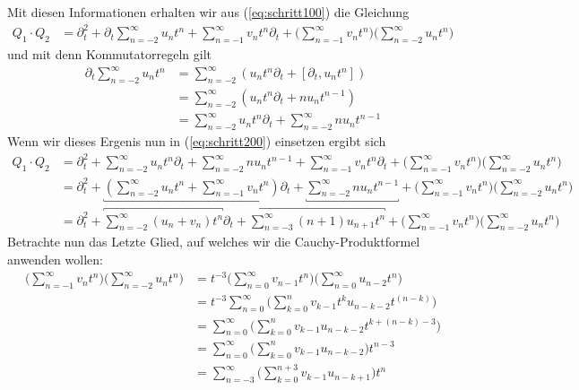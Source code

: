 Mit diesen Informationen erhalten wir aus (\ref{eq:schritt100}) die Gleichung
\begin{align} \label{eq:schritt200}
Q_1\cdot Q_2&=\partial_t^2 + \partial_t \sum_{n=-2}^\infty u_n t^n
  + \sum_{n=-1}^\infty v_nt^n \partial_t
  + \Big(\sum_{n=-1}^\infty v_nt^n \Big)\Big( \sum_{n=-2}^\infty u_n t^n \Big)
\end{align}
und mit denn Kommutatorregeln %
gilt
\begin{align*}
\partial_t \sum_{n=-2}^\infty u_n t^n &=
  \sum_{n=-2}^\infty (u_nt^n\partial_t + [\partial_t,u_nt^n])
\\&= \sum_{n=-2}^\infty (u_nt^n\partial_t + nu_nt^{n-1})
\\&= \sum_{n=-2}^\infty u_nt^n\partial_t + \sum_{n=-2}^\infty nu_nt^{n-1}
\end{align*}
Wenn wir dieses Ergenis nun in (\ref{eq:schritt200}) einsetzen ergibt sich
\begin{equation} \label{eq:schritt300}
  \begin{aligned}
Q_1\cdot Q_2&=\partial_t^2 + \sum_{n=-2}^\infty u_nt^n\partial_t
  + \sum_{n=-2}^\infty nu_nt^{n-1} + \sum_{n=-1}^\infty v_nt^n \partial_t
  + \Big(\sum_{n=-1}^\infty v_nt^n \Big)\Big( \sum_{n=-2}^\infty u_n t^n \Big)
\\&=\partial_t^2 + \underbracket{(\sum_{n=-2}^\infty u_nt^n
  + \sum_{n=-1}^\infty v_nt^n)} \partial_t
  + \underbracket{\sum_{n=-2}^\infty nu_nt^{n-1}}
  + \Big(\sum_{n=-1}^\infty v_nt^n \Big)\Big( \sum_{n=-2}^\infty u_n t^n \Big)
\\&=\partial_t^2 + \overbracket{\sum_{n=-2}^\infty (u_n+v_n)t^n} \partial_t
  + \overbracket{\sum_{n=-3}^\infty (n+1)u_{n+1}t^{n}}
  + \Big(\sum_{n=-1}^\infty v_nt^n \Big)\Big( \sum_{n=-2}^\infty u_n t^n \Big)
  \end{aligned}
\end{equation}
Betrachte nun das Letzte Glied, auf welches wir die Cauchy-Produktformel
anwenden wollen: %
\begin{align*}
\Big(\sum_{n=-1}^\infty v_nt^n \Big)\Big( \sum_{n=-2}^\infty u_n t^n \Big)
  &= t^{-3}\Big(\sum_{n=0}^\infty v_{n-1}t^{n} \Big)
  \Big( \sum_{n=0}^\infty u_{n-2} t^{n} \Big)
\\&= t^{-3}\sum_{n=0}^\infty
  \Big( \sum_{k=0}^n v_{k-1}t^{k} u_{n-k-2} t^{(n-k)} \Big)
\\&= \sum_{n=0}^\infty \Big( \sum_{k=0}^n v_{k-1}u_{n-k-2}t^{k+(n-k)-3} \Big)
\\&= \sum_{n=0}^\infty \Big( \sum_{k=0}^n v_{k-1} u_{n-k-2} \Big) t^{n-3}
\\&= \sum_{n=-3}^\infty \Big( \sum_{k=0}^{n+3} v_{k-1} u_{n-k+1} \Big) t^{n}
\end{align*}
